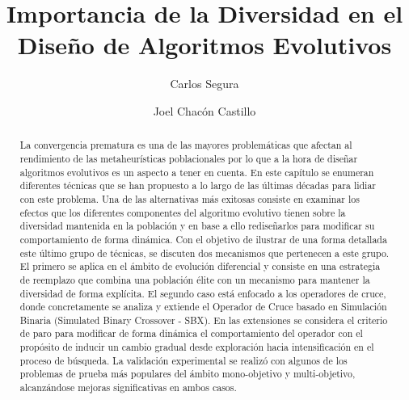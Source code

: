 \documentclass[3p]{elsarticle}
\begin{document}
\begin{frontmatter}

\title{Importancia de la Diversidad en el Diseño de Algoritmos Evolutivos}

\author[label1]{Carlos Segura}

\author[label1]{Joel Chac\'on Castillo}


\address[label1]{Área de Ciencias de Computación, Centro de Investigación de Matemáticas (CIMAT), Callej\'on Jalisco s/n, Mineral de Valenciana, Guanajuato, Guanajuato 36240, Mexico}

\begin{abstract}
La convergencia prematura es una de las mayores problemáticas que afectan al rendimiento de las metaheurísticas poblacionales por lo que
a la hora de diseñar algoritmos evolutivos es un aspecto a tener en cuenta.
%
En este capítulo se enumeran diferentes técnicas que se han propuesto a lo largo de las últimas décadas para lidiar con este problema.
%
Una de las alternativas más exitosas consiste en examinar los efectos que los diferentes componentes del algoritmo evolutivo
tienen sobre la diversidad mantenida en la población y en base a ello rediseñarlos para modificar su comportamiento de forma dinámica.
%
Con el objetivo de ilustrar de una forma detallada este último grupo de técnicas, se discuten dos mecanismos que pertenecen a este grupo.
%
El primero se aplica en el ámbito de evolución diferencial y consiste en una estrategia de reemplazo que combina una población élite con un mecanismo para mantener 
la diversidad de forma explícita.
%
%
%
El segundo caso está enfocado a los operadores de cruce, donde concretamente se analiza y extiende el Operador de Cruce basado en Simulación 
Binaria (Simulated Binary Crossover - SBX).
%
En las extensiones se considera el criterio de paro para modificar de forma dinámica el comportamiento del operador con el propósito de inducir un cambio gradual 
desde exploración hacia intensificación en el proceso de búsqueda.
%
La validación experimental se realizó con algunos de los problemas de prueba más populares del ámbito mono-objetivo y multi-objetivo,
alcanzándose mejoras significativas en ambos casos.
%
\end{abstract}


\end{frontmatter}
\end{document}
